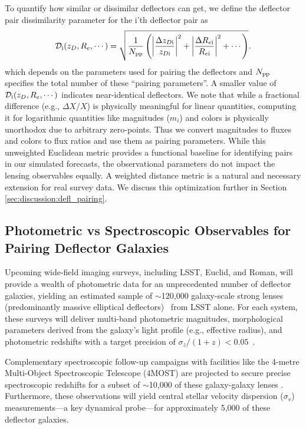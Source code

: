 \documentclass[a4paper,11pt]{article}
\begin{document}
To quantify how similar or dissimilar deflectors can get, we define the deflector pair dissimilarity parameter for the i'th deflector pair as
\begin{equation}\label{eqn:dissimilarity_parameter}
    \mathcal{D}_{\rm i}(z_{D}, R_e, \cdots) = \sqrt{\frac{1}{N_{\rm pp}}\left(\left|\frac{\Delta z_{D\rm i}}{z_{D\rm i}}\right|^2 + \left|\frac{\Delta R_{e\rm i}}{R_{e\rm i}}\right|^2 + \cdots\right)}.
\end{equation}
which depends on the parameters used for pairing the deflectors and $N_{\rm pp}$ specifies the total number of these ``pairing parameters''. A smaller value of $\mathcal{D}_{\rm i}(z_{D}, R_e, \cdots)$ indicates near-identical deflectors. We note that while a fractional difference (e.g., $\Delta X/X$) is physically meaningful for linear quantities, computing it for logarithmic quantities like magnitudes ($m_i$) and colors is physically unorthodox due to arbitrary zero-points. Thus we convert magnitudes to fluxes and colors to flux ratios and use them as pairing parameters. While this unweighted Euclidean metric provides a functional baseline for identifying pairs in our simulated forecasts, the observational parameters do not impact the lensing observables equally. A weighted distance metric is a natural and necessary extension for real survey data. We discuss this optimization further in Section \ref{sec:discussion:defl_pairing}.

\subsection{Photometric vs Spectroscopic Observables for Pairing Deflector Galaxies}
\label{subsec:photo_vs_spectro_params_selection}
Upcoming wide-field imaging surveys, including LSST, Euclid, and Roman, will provide a wealth of photometric data for an unprecedented number of deflector galaxies, yielding an estimated sample of $\sim$120,000 galaxy-scale strong lenses (predominantly massive elliptical deflectors)~\citep{Shajib:2024, Collett:2015, Ferrami:2024, Wedig:2025} from LSST alone. For each system, these surveys will deliver multi-band photometric magnitudes, morphological parameters derived from the galaxy's light profile (e.g., effective radius), and photometric redshifts with a target precision of $\sigma_z/(1+z) < 0.05$~\cite{LSSTScienceBook:2009}.

Complementary spectroscopic follow-up campaigns with facilities like the 4-metre Multi-Object Spectroscopic Telescope (4MOST) are projected to secure precise spectroscopic redshifts for a subset of $\sim$10,000 of these galaxy-galaxy lenses \cite{Collett_4MOST_SLSLS:2023}. Furthermore, these observations will yield central stellar velocity dispersion ($\sigma_v$) measurements---a key dynamical probe---for approximately 5,000 of these deflector galaxies.
\end{document}
